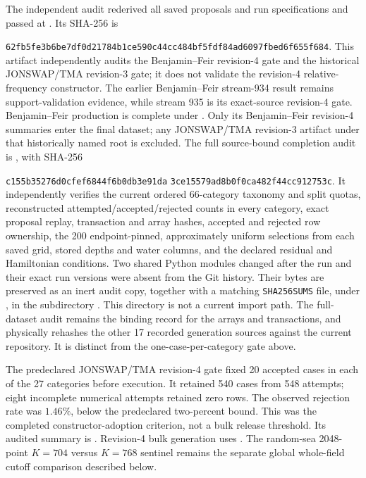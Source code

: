 \documentclass[11pt]{article}
\begin{document}
The independent audit rederived all saved proposals and run specifications
and passed at
.
Its SHA-256 is
\par\noindent
\texttt{62fb5fe3b6be7df0d21784b1ce590c44cc484bf5fdf84ad6097fbed6f655f684}.
This artifact independently audits the Benjamin--Feir revision-4 gate and the
historical JONSWAP/TMA revision-3 gate; it does not validate the revision-4
relative-frequency constructor.  The earlier Benjamin--Feir stream-934 result
remains support-validation evidence, while stream 935 is its exact-source
revision-4 gate.  Benjamin--Feir production is complete under
.
Only its Benjamin--Feir revision-4 summaries enter the final dataset; any
JONSWAP/TMA revision-3 artifact under that historically named root is excluded.
The full source-bound completion audit is
,
with SHA-256
\par\noindent
\texttt{c155b35276d0cfef6844f6b0db3e91da}\allowbreak
\texttt{3ce15579ad8b0f0ca482f44cc912753c}.
It independently verifies the current ordered 66-category taxonomy and split
quotas, reconstructed attempted/accepted/rejected counts in every category,
exact proposal replay, transaction and array hashes, accepted and rejected row
ownership, the 200 endpoint-pinned, approximately uniform selections from each
saved grid, stored depths and water columns, and the declared residual and
Hamiltonian conditions.  Two shared Python modules
changed after the run and their exact run versions were absent from the Git
history.  Their bytes are preserved as an inert audit copy, together with a
matching \texttt{SHA256SUMS} file, under
, in the subdirectory
.
This directory is not a current import path.  The full-dataset audit remains
the binding record for the arrays and transactions, and physically rehashes
the other 17 recorded generation sources against the current repository.  It
is distinct from the one-case-per-category gate above.

The predeclared JONSWAP/TMA revision-4 gate fixed 20 accepted cases in each
of the 27 categories before execution.  It retained 540 cases from 548
attempts; eight incomplete numerical attempts retained zero rows.  The
observed rejection rate was $1.46\%$, below the predeclared two-percent bound.
This was the completed constructor-adoption criterion, not a bulk release
threshold.
Its audited summary is
.
Revision-4 bulk generation uses
.
The random-sea 2048-point $K=704$ versus $K=768$ sentinel remains the separate
global whole-field cutoff comparison described below.
\end{document}
